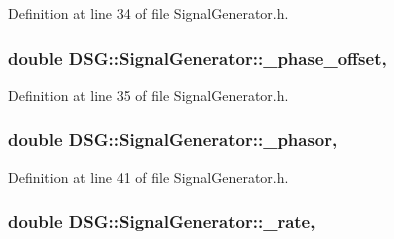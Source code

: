 Definition at line 34 of file Signal\-Generator.\-h.

\hypertarget{classDSG_1_1SignalGenerator_a9abf9d00c798e0fdca6314f17547758a}{
\subsubsection[{\-\_\-phase\-\_\-offset}]{\setlength{\rightskip}{0pt plus 5cm}double D\-S\-G\-::\-Signal\-Generator\-::\-\_\-phase\-\_\-offset\hspace{0.3cm}{\ttfamily [protected]}, {\ttfamily [inherited]}}}\label{classDSG_1_1SignalGenerator_a9abf9d00c798e0fdca6314f17547758a}


Definition at line 35 of file Signal\-Generator.\-h.

\hypertarget{classDSG_1_1SignalGenerator_ac2271b582bf699275f077ecb642a8cd9}{
\subsubsection[{\-\_\-phasor}]{\setlength{\rightskip}{0pt plus 5cm}double D\-S\-G\-::\-Signal\-Generator\-::\-\_\-phasor\hspace{0.3cm}{\ttfamily [protected]}, {\ttfamily [inherited]}}}\label{classDSG_1_1SignalGenerator_ac2271b582bf699275f077ecb642a8cd9}


Definition at line 41 of file Signal\-Generator.\-h.

\hypertarget{classDSG_1_1SignalGenerator_aa10f6c85d9adee901139ea7fb346f39d}{
\subsubsection[{\-\_\-rate}]{\setlength{\rightskip}{0pt plus 5cm}double D\-S\-G\-::\-Signal\-Generator\-::\-\_\-rate\hspace{0.3cm}{\ttfamily [protected]}, {\ttfamily [inherited]}}}\label{classDSG_1_1SignalGenerator_aa10f6c85d9adee901139ea7fb346f39d}


